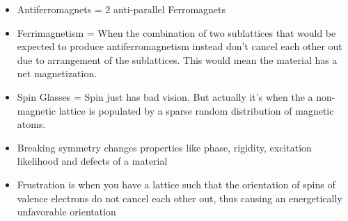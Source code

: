 \documentclass[11pt,onecolumn]{article}
\begin{document}
\begin{itemize}
	\item Antiferromagnets = 2 anti-parallel Ferromagnets
	\item Ferrimagnetism = When the combination of two sublattices that would be expected to produce antiferromagnetism instead don't cancel each other out due to arrangement of the sublattices. This would mean the material has a net magnetization.
	\item Spin Glasses = Spin just has bad vision. But actually it's when the a non-magnetic lattice is populated by a sparse random distribution of magnetic atoms.
	\item Breaking symmetry changes properties like phase, rigidity, excitation likelihood and defects of a material
	\item Frustration is when you have a lattice such that the orientation of spins of valence electrons do not cancel each other out, thus causing an energetically unfavorable orientation
\end{itemize}
\end{document}
